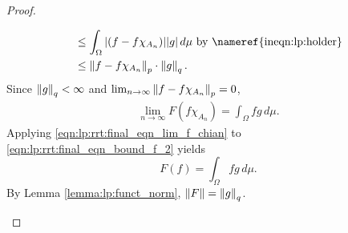 \begin{proof}
\begin{step}
\begin{align*}
    &\leq  \int_\Omega | (f - f \chi_{A_n}) | | g |  \,d\mu \text{ by \nameref{ineqn:lp:holder}} \\
    &\leq \norm{f - f \chi_{A_n}}_p \cdot \norm{g}_q.
\end{align*}
Since $\left\lVert g\right\rVert_q < \infty$ and $\lim_{n \to \infty} \left\lVert f - f \chi_{A_n}\right\rVert_p = 0$, \begin{align}
    \label{eqn:lp:rrt:final_eqn_lim_f_chian}
    \lim_{n \to \infty} F(f \chi_{A_n}) = \int_\Omega f g \,d\mu.
\end{align}
Applying \ref{eqn:lp:rrt:final_eqn_lim_f_chian} to \ref{eqn:lp:rrt:final_eqn_bound_f_2} yields \[ 
    F(f) = \int_\Omega f g \,d\mu.
\]
By Lemma \ref{lemma:lp:funct_norm}, $\left\lVert F\right\rVert = \left\lVert g\right\rVert_q$.
\end{step}
\end{proof}